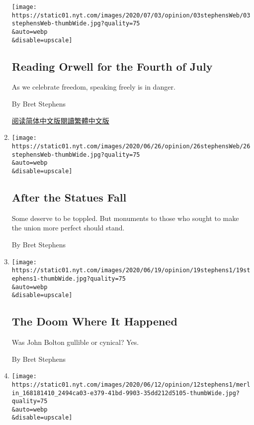 \begin{enumerate}
  \texttt{[image: https://static01.nyt.com/images/2020/07/03/opinion/03stephensWeb/03stephensWeb-thumbWide.jpg?quality=75\\\&auto=webp\\\&disable=upscale]}

  \hypertarget{reading-orwell-for-the-fourth-of-july}{%
  \subsection{Reading Orwell for the Fourth of
  July}\label{reading-orwell-for-the-fourth-of-july}}

  As we celebrate freedom, speaking freely is in danger.

  By Bret Stephens

  \href{https://cn.nytimes.com/opinion/20200706/orwell-fourth-of-july/}{阅读简体中文版}\href{https://cn.nytimes.com/opinion/20200706/orwell-fourth-of-july/zh-hant/}{閱讀繁體中文版}
\item
  \href{/2020/06/26/opinion/statues-protests.html}{}

  \texttt{[image: https://static01.nyt.com/images/2020/06/26/opinion/26stephensWeb/26stephensWeb-thumbWide.jpg?quality=75\\\&auto=webp\\\&disable=upscale]}

  \hypertarget{after-the-statues-fall}{%
  \subsection{After the Statues Fall}\label{after-the-statues-fall}}

  Some deserve to be toppled. But monuments to those who sought to make
  the union more perfect should stand.

  By Bret Stephens
\item
  \href{/2020/06/19/opinion/bolton-book.html}{}

  \texttt{[image: https://static01.nyt.com/images/2020/06/19/opinion/19stephens1/19stephens1-thumbWide.jpg?quality=75\\\&auto=webp\\\&disable=upscale]}

  \hypertarget{the-doom-where-it-happened}{%
  \subsection{The Doom Where It
  Happened}\label{the-doom-where-it-happened}}

  Was John Bolton gullible or cynical? Yes.

  By Bret Stephens
\item
  \href{/2020/06/12/opinion/tom-cotton-op-ed.html}{}

  \texttt{[image: https://static01.nyt.com/images/2020/06/12/opinion/12stephens1/merlin\_168181410\_2494ca03-e379-41bd-9903-35dd212d5105-thumbWide.jpg?quality=75\\\&auto=webp\\\&disable=upscale]}


\end{enumerate}
